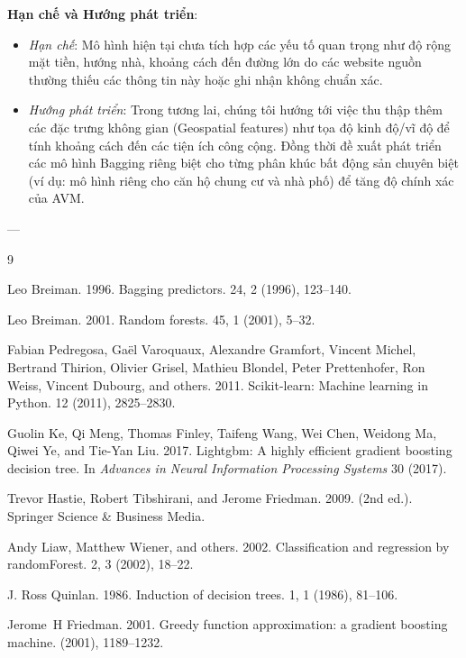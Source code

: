 \documentclass[sigconf]{acmart}
\begin{document}
\textbf{Hạn chế và Hướng phát triển}:
\begin{itemize}
    \item \textit{Hạn chế}: Mô hình hiện tại chưa tích hợp các yếu tố quan trọng như độ rộng mặt tiền, hướng nhà, khoảng cách đến đường lớn do các website nguồn thường thiếu các thông tin này hoặc ghi nhận không chuẩn xác.
    \item \textit{Hướng phát triển}: Trong tương lai, chúng tôi hướng tới việc thu thập thêm các đặc trưng không gian (Geospatial features) như tọa độ kinh độ/vĩ độ để tính khoảng cách đến các tiện ích công cộng. Đồng thời đề xuất phát triển các mô hình Bagging riêng biệt cho từng phân khúc bất động sản chuyên biệt (ví dụ: mô hình riêng cho căn hộ chung cư và nhà phố) để tăng độ chính xác của AVM.
\end{itemize}

---


\begin{thebibliography}{9}

Leo Breiman. 1996.
\newblock Bagging predictors.
 24, 2 (1996), 123--140.

Leo Breiman. 2001.
\newblock Random forests.
 45, 1 (2001), 5--32.

Fabian Pedregosa, Ga{\"e}l Varoquaux, Alexandre Gramfort, Vincent Michel, Bertrand Thirion, Olivier Grisel, Mathieu Blondel, Peter Prettenhofer, Ron Weiss, Vincent Dubourg, and others. 2011.
\newblock Scikit-learn: Machine learning in Python.
 12 (2011), 2825--2830.

Guolin Ke, Qi Meng, Thomas Finley, Taifeng Wang, Wei Chen, Weidong Ma, Qiwei Ye, and Tie-Yan Liu. 2017.
\newblock Lightgbm: A highly efficient gradient boosting decision tree.
\newblock In {\em Advances in Neural Information Processing Systems} 30 (2017).

Trevor Hastie, Robert Tibshirani, and Jerome Friedman. 2009.
 (2nd ed.).
\newblock Springer Science \& Business Media.

Andy Liaw, Matthew Wiener, and others. 2002.
\newblock Classification and regression by randomForest.
 2, 3 (2002), 18--22.

J. Ross Quinlan. 1986.
\newblock Induction of decision trees.
 1, 1 (1986), 81--106.

Jerome~H Friedman. 2001.
\newblock Greedy function approximation: a gradient boosting machine.
 (2001), 1189--1232.

\end{thebibliography}
\end{document}
